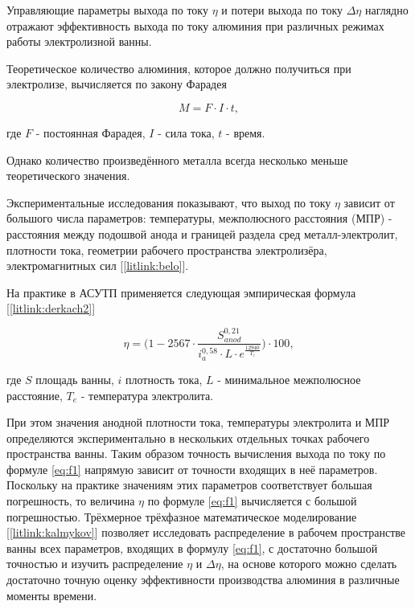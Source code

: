 \documentclass[]{pmi}
\begin{document}

Управляющие параметры выхода по току $\eta$ и потери выхода по току $\Delta \eta$ наглядно отражают эффективность выхода по току алюминия при различных режимах работы электролизной ванны.

Теоретическое количество алюминия, которое должно получиться при электролизе, вычисляется по закону Фарадея

\begin{equation}\label{eq:farad}
M = F \cdot I \cdot t,
\end{equation}

где $F$ - постоянная Фарадея, $I$ - сила тока, $t$ - время.

Однако количество произведённого металла всегда несколько меньше теоретического значения.

Экспериментальные исследования показывают, что выход по току $\eta$ зависит от большого числа параметров: температуры, межполюсного расстояния (МПР) - расстояния между подошвой анода и границей раздела сред металл-электролит, плотности тока, геометрии рабочего пространства электролизёра, электромагнитных сил [\ref{litlink:belo}].

На практике в АСУТП применяется следующая эмпирическая формула [\ref{litlink:derkach2}]

\begin{equation}\label{eq:f1}
\eta = \bigg(1-2567 \cdot \frac{S^{0,21}_{anod}}{i^{0,58}_{a}\cdot L \cdot e^{\frac{12940}{T_e}}}\bigg) \cdot 100,
\end{equation}

где $S$ площадь ванны, $i$ плотность тока, $L$ - минимальное межполюсное расстояние, $T_e$ - температура электролита.

При этом значения анодной плотности тока, температуры электролита и МПР определяются экспериментально в нескольких отдельных точках рабочего пространства ванны.
Таким образом точность вычисления выхода по току по формуле \ref{eq:f1} напрямую зависит от точности входящих в неё параметров. Поскольку на практике значениям этих параметров соответствует большая погрешность, то величина $\eta$ по формуле \ref{eq:f1} вычисляется с большой погрешностью. Трёхмерное трёхфазное математическое моделирование [\ref{litlink:kalmykov}] позволяет исследовать распределение в рабочем пространстве ванны всех параметров, входящих в формулу \ref{eq:f1}, с достаточно большой точностью и изучить распределение $\eta$ и $\Delta\eta$, на основе которого можно сделать достаточно точную оценку эффективности производства алюминия в различные моменты времени.
\end{document}
